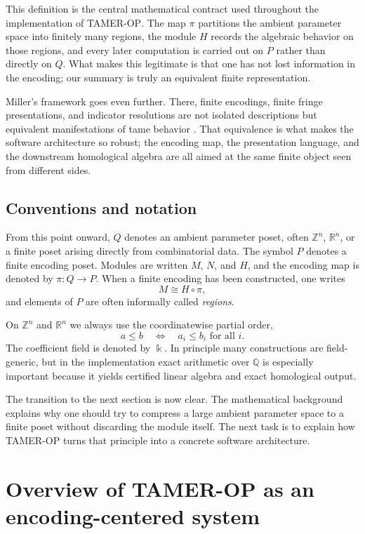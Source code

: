 \documentclass[11pt]{article}
\newcommand{\Q}{\mathbb{Q}}
\newcommand{\kk}{\Bbbk}
\newcommand{\TAMER}{\textsc{TAMER-OP}}
\theoremstyle{definition}
\theoremstyle{remark}
\begin{document}
This definition is the central mathematical contract used throughout the implementation of \TAMER{}.  The map $\pi$ partitions the ambient parameter space into finitely many regions, the module $H$ records the algebraic behavior on those regions, and every later computation is carried out on $P$ rather than directly on $Q$.  What makes this legitimate is that one has not lost information in the encoding; our summary is truly an equivalent finite representation.

Miller's framework goes even further. There, finite encodings, finite fringe presentations, and indicator resolutions are not isolated descriptions but equivalent manifestations of tame behavior \cite{Mil20}.  That equivalence is what makes the software architecture so robust; the encoding map, the presentation language, and the downstream homological algebra are all aimed at the same finite object seen from different sides.  

\subsection{Conventions and notation}

From this point onward, $Q$ denotes an ambient parameter poset, often $\mathbb{Z}^n$, $\mathbb{R}^n$, or a finite poset arising directly from combinatorial data.  The symbol $P$ denotes a finite encoding poset.  Modules are written $M$, $N$, and $H$, and the encoding map is denoted by $\pi\colon Q\to P$.  When a finite encoding has been constructed, one writes
\[
M \cong H\circ \pi,
\]
and elements of $P$ are often informally called \emph{regions}.

On $\mathbb{Z}^n$ and $\mathbb{R}^n$ we always use the coordinatewise partial order,
\[
a\leq b \quad \Longleftrightarrow \quad a_i\leq b_i \text{ for all } i.
\]
The coefficient field is denoted by $\kk$.  In principle many constructions are field-generic, but in the implementation exact arithmetic over $\Q$ is especially important because it yields certified linear algebra and exact homological output.

The transition to the next section is now clear.  The mathematical background explains why one should try to compress a large ambient parameter space to a finite poset without discarding the module itself.  The next task is to explain how \TAMER{} turns that principle into a concrete software architecture.

\section{Overview of \TAMER{} as an encoding-centered system}\label{sec:system-overview}
\end{document}
